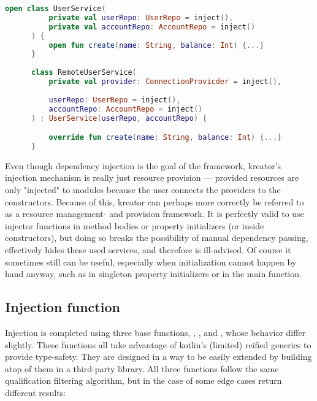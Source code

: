 		\begin{center}
				\begin{minipage}{12cm}
		\begin{lstlisting}[language=Kotlin, title={\code{userService.kt}}]
	  open class UserService(
		  private val userRepo: UserRepo = inject(),
		  private val accountRepo: AccountRepo = inject()
	  ) {
		  open fun create(name: String, balance: Int) {...}
	  }
	  
	  class RemoteUserService(
		  private val provider: ConnectionProvicder = inject(),
		  
		  userRepo: UserRepo = inject(),
		  accountRepo: AccountRepo = inject()
	  ) : UserService(userRepo, accountRepo) {

		  override fun create(name: String, balance: Int) {...}
	  }
		\end{lstlisting}
				\end{minipage}
			\end{center}
	
		Even though dependency injection is the goal of the framework, kreator's injection mechanism is really just resource provision --- provided resources are only "injected" to modules because the user connects the providers to the constructors. Because of this, kreator can perhaps more correctly be referred to as a resource management- and provision framework. It is perfectly valid to use injector functions in method bodies or property initializers (or inside constructors), but doing so breaks the possibility of manual dependency passing, effectively hides these used services, and therefore is ill-advised. Of course it sometimes still can be useful, especially when initialization cannot happen by hand anyway, such as in singleton property initializers or in the main function.
	
		\subsection*{Injection function}
		
		Injection is completed using three base functions, , , and , whose behavior differ slightly. These functions all take advantage of kotlin's (limited) reified generics to provide type-safety. They are designed in a way to be easily extended by building atop of them in a third-party library. All three functions follow the same qualification filtering algorithm, but in the case of some edge cases return different results:
	
